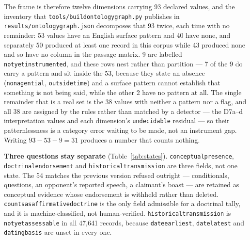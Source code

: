 \documentclass[11pt]{article}
\DeclareRobustCommand{\_}{\textunderscore\allowbreak}
\newcommand{\field}[1]{\texttt{\small #1}}
\begin{document}
The frame is therefore twelve dimensions carrying 93 declared values, and the
inventory that \texttt{tools/build\_ontology\_graph.py} publishes in
\texttt{results/ontology\_graph.json} decomposes that 93 twice, each time with no
remainder: 53 values have an English surface pattern and 40 have none, and
separately 50 produced at least one record in this corpus while 43 produced none and
so have no column in the passage matrix. 9 are labelled
\field{not\_yet\_instrumented}, and these rows nest rather than partition --- 7 of
the 9 do carry a pattern and sit inside the 53, because they state an absence
(\field{non\_agential}, \field{outside\_time}) and a surface pattern cannot
establish that something is not being said, while the other 2 have no pattern at all.
The single remainder that is a real set is the 38 values with neither a pattern nor a
flag, and all 38 are assigned by the rules rather than matched by a detector --- the
D7a--d interpretation values and each dimension's \field{undecidable} residual --- so
their patternlessness is a category error waiting to be made, not an instrument gap.
Writing \(93 - 53 - 9 = 31\) produces a number that counts nothing.

\textbf{Three questions stay separate} (Table~\ref{tab:states}).
\field{conceptual\_presence}, \field{doctrinal\_endorsement} and
\field{historical\_transmission} are three fields, not one state. The 54 matches
the previous version refused outright --- conditionals, questions, an opponent's
reported speech, a claimant's boast --- are retained as conceptual evidence whose
endorsement is withheld rather than deleted.
\field{counts\_as\_affirmative\_doctrine} is the only field admissible for a
doctrinal tally, and it is machine-classified, not human-verified.
\field{historical\_transmission} is \texttt{not\_yet\_assessable} in all 47{,}641
records, because \field{date\_earliest}, \field{date\_latest} and
\field{dating\_basis} are unset in every one.
\end{document}
